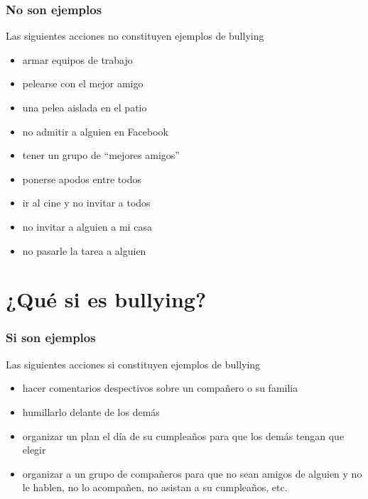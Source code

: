 \documentclass[12pt,spanish,x11names]{beamer}
\begin{document}
\begin{frame}
  \frametitle{No son ejemplos}
  \begin{alertblock}{Las siguientes acciones no constituyen ejemplos de bullying}
    \begin{itemize}
      \pause
    \item<+-> armar equipos de trabajo
    \item<+-> pelearse con el mejor amigo
    \item<+-> una pelea aislada en el patio
    \item<+-> no admitir a alguien en Facebook
    \item<+-> tener un grupo de ``mejores amigos''
    \item<+-> ponerse apodos entre todos
    \item<+-> ir al cine y no invitar a todos
    \item<+-> no invitar a alguien a mi casa
    \item<+-> no pasarle la tarea a alguien   
    \end{itemize}
  \end{alertblock}
\end{frame}
\section{¿Qué si es bullying?}
\begin{frame}
  \frametitle{Si son ejemplos}
  \begin{exampleblock}{Las siguientes acciones si constituyen ejemplos de
      bullying}
    \pause
    \begin{itemize}
    \item<+-> hacer comentarios despectivos sobre un compañero o su familia
    \item<+-> humillarlo delante de los demás
    \item<+-> organizar un plan el día de su cumpleaños para que los demás
        tengan que elegir
      \item<+-> organizar a un grupo de compañeros para que no sean amigos de
        alguien y no le hablen, no lo acompañen, no asistan a su cumpleaños,
        etc.
    \end{itemize}
  \end{exampleblock}
\end{frame}
\end{document}
